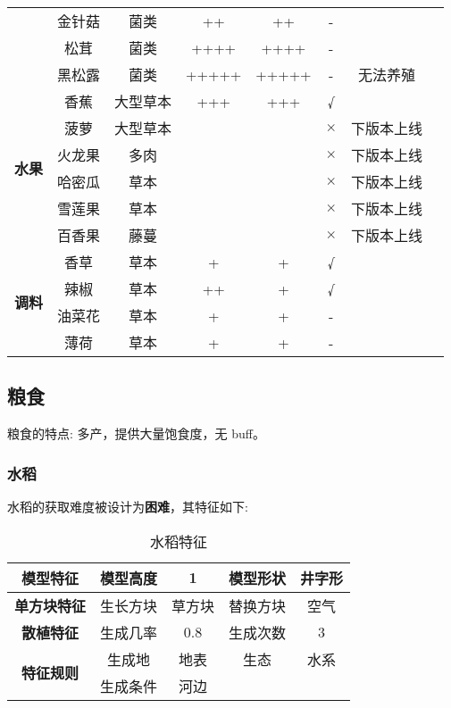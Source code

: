 \begin{center}
\begin{longtable}{c|cc|ccccc}
        & 金针菇   & 菌类  & ++    & ++ & - &        \\
        & 松茸   & 菌类  & ++++    & ++++ & -  &       \\
        & 黑松露   & 菌类  & +++++    & +++++ & - & 无法养殖   \\
        \midrule
        \multirow{6}{*}{\textbf{水果}}& 香蕉 & 大型草本 & +++ & +++ & √ & \\
        & 菠萝 & 大型草本 &  &  & $\times$ & 下版本上线 \\
        & 火龙果 & 多肉 &  &  & $\times$ & 下版本上线 \\
        & 哈密瓜 & 草本 &  &  & $\times$ & 下版本上线 \\
        & 雪莲果 & 草本 &  &  & $\times$ & 下版本上线 \\
        & 百香果 & 藤蔓 &  &  & $\times$ & 下版本上线 \\
        \midrule
        \multirow{4}{*}{\textbf{调料}}& 香草 & 草本 & + & + & √ & \\
        & 辣椒 & 草本  & ++ & + & √ & \\
        & 油菜花 & 草本 & + & + & - & \\
        & 薄荷 & 草本 & + & + & - & \\
        \bottomrule
    \end{longtable}
\end{center}

\subsection{粮食}

粮食的特点: 多产，提供大量饱食度，无 buff。

\subsubsection{水稻}

水稻的获取难度被设计为\textbf{困难}，其特征如下:
\begin{table}[H]
    \centering
    \caption{水稻特征}
    \label{table:水稻特征}
    \setlength{\tabcolsep}{4mm}
    \begin{tabular}{c|cc|cc}
        \toprule
        \textbf{模型特征}                  & 模型高度 & 1      & 模型形状 & 井字形 \\
        \midrule
        \textbf{单方块特征}                & 生长方块 & 草方块 & 替换方块 & 空气   \\
        \midrule
        \textbf{散植特征}                  & 生成几率 & 0.8    & 生成次数 & 3      \\
        \midrule
        \multirow{2}{*}{\textbf{特征规则}} & 生成地   & 地表   & 生态     & 水系   \\
                                           & 生成条件 & 河边                       \\
        \bottomrule
    \end{tabular}
\end{table}


